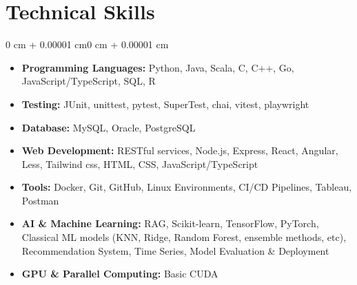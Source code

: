 \documentclass[10pt, letterpaper]{article}
\newenvironment{highlights}{
    \begin{itemize}[
        topsep=0.10 cm,
        parsep=0.10 cm,
        partopsep=0pt,
        itemsep=0pt,
        leftmargin=0 cm + 10pt
    ]
}{
    \end{itemize}
}
\newenvironment{onecolentry}{
    \begin{adjustwidth}{0 cm + 0.00001 cm}{0 cm + 0.00001 cm}
}{
    \end{adjustwidth}
}
\newenvironment{twocolentry}[2][]{
    \onecolentry
    \def\secondColumn{#2}
    \setcolumnwidth{\fill, 4.5 cm}
    \begin{paracol}{2}
}{
    \switchcolumn \raggedleft \secondColumn
    \end{paracol}
    \endonecolentry
}
\begin{document}

    \vspace{0.2 cm}

    \section{Technical Skills}
    
    \vspace{0.10 cm}
    \begin{onecolentry}
        \begin{highlights}
            \item \textbf{Programming Languages:} Python, Java, Scala, C, C++, Go, JavaScript/TypeScript, SQL, R
            \item \textbf{Testing:} JUnit, unittest, pytest, SuperTest, chai, vitest, playwright
            \item \textbf{Database:} MySQL, Oracle, PostgreSQL
            \item \textbf{Web Development:} RESTful services, Node.js, Express, React, Angular, Less, Tailwind css, HTML, CSS, JavaScript/TypeScript
            \item \textbf{Tools:} Docker, Git, GitHub, Linux Environments, CI/CD Pipelines, Tableau, Postman
            \item \textbf{AI \& Machine Learning:} RAG, Scikit-learn, TensorFlow, PyTorch, 
            Classical ML models (KNN, Ridge, Random Forest, ensemble methods, etc), Recommendation System, 
            Time Series, Model Evaluation \& Deployment
            \item \textbf{GPU \& Parallel Computing:} Basic CUDA
        \end{highlights}
    \end{onecolentry}
    
\end{document}
